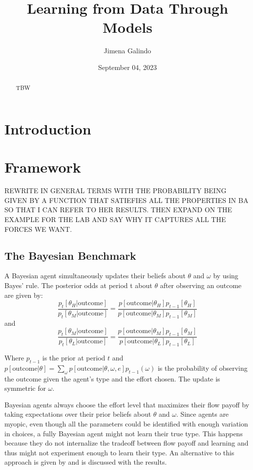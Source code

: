 \documentclass[
  12pt,
]{article}
\title{Learning from Data Through Models}
\author{Jimena Galindo}
\date{September 04, 2023}
\begin{document}
\maketitle
\begin{abstract}
TBW
\end{abstract}

\hypertarget{introduction}{%
\section{Introduction}\label{introduction}}

\hypertarget{framework}{%
\section{Framework}\label{framework}}

REWRITE IN GENERAL TERMS WITH THE PROBABILITY BEING GIVEN BY A FUNCTION
THAT SATIEFIES ALL THE PROPERTIES IN BA SO THAT I CAN REFER TO HER
RESULTS. THEN EXPAND ON THE EXAMPLE FOR THE LAB AND SAY WHY IT CAPTURES
ALL THE FORCES WE WANT.

\hypertarget{the-bayesian-benchmark}{%
\subsection{The Bayesian Benchmark}\label{the-bayesian-benchmark}}

A Bayesian agent simultaneously updates their beliefs about \(\theta\)
and \(\omega\) by using Bayes' rule. The posterior odds at period t
about \(\theta\) after observing an outcome are given by:
\begin{equation}
\frac{p_{t}[\theta_H|\text{outcome}]}{p_{t}[\theta_M|\text{outcome}]} = 
      \frac{p[\text{outcome}|\theta_H]p_{t-1}[\theta_H]}{p[\text{outcome}|\theta_M]p_{t-1}[\theta_M]}
\end{equation} and \begin{equation}
\frac{p_{t}[\theta_M|\text{outcome}]}{p_{t}[\theta_L|\text{outcome}]} = 
      \frac{p[\text{outcome}|\theta_M]p_{t-1}[\theta_M]}{p[\text{outcome}|\theta_L]p_{t-1}[\theta_L]}
\end{equation}

Where \(p_{t-1}\) is the prior at period \(t\) and
\(p[\text{outcome}|\theta] = \sum_{\omega} p[\text{outcome}|\theta, \omega, e]p_{t-1}(\omega)\)
is the probability of observing the outcome given the agent's type and
the effort chosen. The update is symmetric for \(\omega\).

Bayesian agents always choose the effort level that maximizes their flow
payoff by taking expectations over their prior beliefs about \(\theta\)
and \(\omega\). Since agents are myopic, even though all the parameters
could be identified with enough variation in choices, a fully Bayesian
agent might not learn their true type. This happens because they do not
internalize the tradeoff between flow payoff and learning and thus might
not experiment enough to learn their type. An alternative to this
approach is given by \citet{Hestermann2021} and is discussed with the
results.
\end{document}
